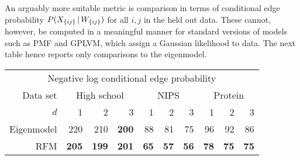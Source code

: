 An arguably more suitable metric is comparison in terms of conditional edge probability \ie ${P(X_{\lbrace ij \rbrace} \,|\, W_{\lbrace ij \rbrace})}$ for all $i,j$ in the held out data. These cannot, however, be computed in a meaningful manner for
standard versions of models such as PMF and GPLVM, which assign a Gaussian likelihood to data. The next table hence reports only comparisons to the eigenmodel.

\begin{center}
  \begin{tabular}{r | r r r | r r r | r r r}
     \multicolumn{10}{c}{Negative log conditional edge probability\footnotemark} \\
     \addlinespace[2pt]
     Data set & \multicolumn{3}{c|}{High school} & \multicolumn{3}{c|}{NIPS} & \multicolumn{3}{c}{Protein} \\
    $d$ & 1 & 2 & 3 & 1 & 2 & 3 & 1 & 2 & 3 \\
    \midrule
    Eigenmodel & 220 & 210 & \textbf{200} & 88 & 81 & 75 & 96 & 92 & 86 \\
    RFM & \textbf{205} & \textbf{199} & \textbf{201} & \textbf{65} & \textbf{57} & \textbf{56} & \textbf{78} & \textbf{75} & \textbf{75}
  \end{tabular}
\end{center}

